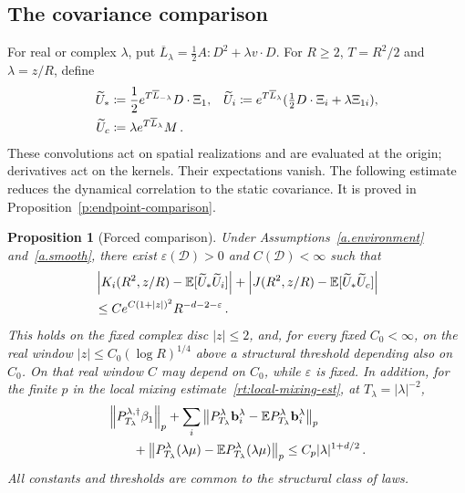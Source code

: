 \documentclass[11pt]{amsart}
\newtheorem{proposition}{Proposition}[section]
\theoremstyle{definition}
\theoremstyle{remark}
\numberwithin{equation}{section}
\newcommand{\E}{\mathbb E}
\renewcommand{\b}{\mathbf b}
\renewcommand{\epsilon}{\varepsilon}
\newcommand{\norm}[1]{\left\|#1\right\|}
\newcommand{\abs}[1]{\left|#1\right|}
\begin{document}
\subsection{The covariance comparison}\label{ss.scalar-homogenization}

For real or complex $\lambda$, put $\overline L_\lambda=\frac12A:D^2+\lambda v\cdot D$. For $R\geq2$, $T=R^2/2$ and $\lambda=z/R$, define
\begin{align}\label{e:model-endpoints}
 \widetilde U_*&\coloneqq\frac12e^{T\overline L_{-\lambda}}D\cdot\Xi_1,
 &\widetilde U_i&\coloneqq e^{T\overline L_\lambda}(\tfrac12D\cdot\Xi_i+\lambda\Xi_{1i}),\notag\\
 \widetilde U_c&\coloneqq\lambda e^{T\overline L_\lambda}M\, .
\end{align}
These convolutions act on spatial realizations and are evaluated at the origin; derivatives act on the kernels. Their expectations vanish. The following estimate reduces the dynamical correlation to the static covariance. It is proved in Proposition~\ref{p:endpoint-comparison}.

\begin{proposition}[Forced comparison]\label{h:forced}
Under Assumptions~\ref{a.environment} and~\ref{a.smooth}, there exist $\epsilon(\mathcal D)>0$ and $C(\mathcal D)<\infty$ such that
\begin{align}\label{e:bridge}
 &\abs{K_i(R^2,z/R)-\E[\widetilde U_*\widetilde U_i]}
 +\abs{J(R^2,z/R)-\E[\widetilde U_*\widetilde U_c]}\notag\\
 &\leq C e^{C(1+|z|)^2}R^{-d-2-\epsilon}\, .
\end{align}
This holds on the fixed complex disc $|z|\leq2$, and, for every fixed $C_0<\infty$, on the real window $|z|\leq C_0(\log R)^{1/4}$ above a structural threshold depending also on $C_0$. On that real window $C$ may depend on $C_0$, while $\epsilon$ is fixed. In addition, for the finite $p$ in the local mixing estimate~\eqref{rt:local-mixing-est}, at $T_\lambda=|\lambda|^{-2}$,
\begin{align}\label{e:endpoint-moments}
 &\norm{P_{T_\lambda}^{\lambda,\dagger}\beta_1}_p
 +\sum_i\norm{P_{T_\lambda}^\lambda \b_i^\lambda
                   -\E P_{T_\lambda}^\lambda \b_i^\lambda}_p\notag\\
 &\qquad+\norm{P_{T_\lambda}^\lambda(\lambda\mu)
                   -\E P_{T_\lambda}^\lambda(\lambda\mu)}_p
 \leq C_p|\lambda|^{1+d/2}\, .
\end{align}
All constants and thresholds are common to the structural class of laws.
\end{proposition}
\end{document}
